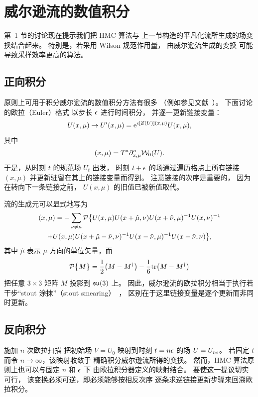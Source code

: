 \section{威尔逊流的数值积分}

第~1 节的讨论现在提示我们把 HMC 算法与
上一节构造的平凡化流所生成的场变换结合起来。
特别是，若采用 Wilson 规范作用量，
由威尔逊流生成的变换
可能导致采样效率更高的算法。


\subsection{正向积分}

原则上可用于积分威尔逊流的数值积分方法有很多
（例如参见文献~\cite{HairerEtAl}）。
下面讨论的欧拉（Euler）格式
以步长 $\epsilon$ 进行时间积分，
并逐一更新链接变量：
\begin{equation}
   U(x,\mu)\to U'(x,\mu)=\mathrm{e}^{\epsilon [Z(U)](x,\mu)}U(x,\mu),
\end{equation}
其中
\begin{equation}
   [Z(U)](x,\mu)=T^a\du^a_{x,\mu}\Wl_0(U).
\end{equation}
于是，从时刻 $t$ 的规范场 $U_t$ 出发，
时刻 $t+\epsilon$ 的场通过遍历格点上所有链接 $(x,\mu)$
并更新驻留在其上的链接变量而得到。
注意链接的次序是重要的，
因为在转向下一条链接之前，
$U(x,\mu)$ 的旧值已被新值取代。

流的生成元可以显式地写为
\begin{multline}
   [Z(U)](x,\mu)=
   -\sum_{\nu\neq\mu}\Proj\bigl\{
   U(x,\mu)U(x+\hat{\mu},\nu)U(x+\hat{\nu},\mu)^{-1}U(x,\nu)^{-1}\\
   +U(x,\mu)U(x+\hat{\mu}-\hat{\nu},\nu)^{-1}U(x-\hat{\nu},\mu)^{-1}
   U(x-\hat{\nu},\nu)\bigr\},
\end{multline}
其中 $\hat{\mu}$ 表示 $\mu$ 方向的单位矢量，而
\begin{equation}
   \mathcal{P}\bigl\{M\bigr\}=\frac{1}{2}\bigl(M-M^{\dagger}\bigr)-
   \frac{1}{6}\mathrm{tr}\bigl(M-M^{\dagger}\bigr)
\end{equation}
把任意 $3\times3$ 矩阵 $M$ 投影到 $\mathfrak{su}(3)$ 上。
因此，威尔逊流的欧拉积分相当于执行若干步``stout 涂抹''（stout smearing）~\cite{Stout}，
区别在于这里链接变量是逐个更新而非同时更新。


\subsection{反向积分}

施加 $n$ 次欧拉扫描
把初始场 $V=U_0$
映射到时刻 $t=n\epsilon$ 的场 $U=U_{n\epsilon}$。
若固定 $t$ 而令 $n\to\infty$，该映射收敛于
精确积分威尔逊流所得的变换。
然而，HMC 算法原则上也可以与固定 $n$ 和 $\epsilon$ 下
由欧拉积分器定义的映射结合。
要使这一提议切实可行，
该变换必须可逆，即必须能够按相反次序
逐条求逆链接更新步骤来回溯欧拉积分。

